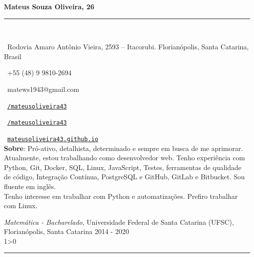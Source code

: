 \documentclass[a4paper,10pt]{article}
\makeatletter
\newcommand{\profissional}{Mateus Souza Oliveira}
\newcommand{\idade}{26}
\newcommand{\Endereco}{Rodovia Amaro Antônio Vieira, 2593 -- Itacorubi. Florianópolis, Santa Catarina, Brasil}
\newcommand{\telefone}{+55 (48) 9 9810-2694}
\newcommand{\email}{matews1943@gmail.com}
\newcommand{\sobre}{
    Pró-ativo, detalhista, determinado e sempre em busca de me aprimorar. Atualmente, estou trabalhando como desenvolvedor web. Tenho experiência com Python, Git, Docker, SQL, Linux, JavaScript, Testes, ferramentas de qualidade de código, Integração Contínua, PostgreSQL e GitHub, GitLab e Bitbucket. Sou fluente em inglês.\\

    Tenho interesse em trabalhar com Python e automatizações. Prefiro trabalhar com Linux.
}
\newcommand{\criaSecao}[4][0]{
	\begin{tcolorbox}[
        blanker,
        breakable,
        title=\begin{minipage}{0.16\linewidth}\large{\textbf{#2}}\vspace{-#3\baselineskip}\end{minipage},
        coltitle=black,
        leftupper=0.21\linewidth,
    ]
        #4
		\ifnum0#1>0 { \hrule {\ } } \fi
    \end{tcolorbox}
}
\makeatother
\begin{document}
	\begin{minipage}{0.65\linewidth}
		\Huge{\bf \profissional, \idade}\\\vspace{-1.75\baselineskip}

		\noindent\rule{\textwidth}{1.5pt} {\ }\\\vspace{-1.8\baselineskip}

		\large{
		\faMapMarker \ \Endereco \\
		\begin{minipage}{0.5\linewidth}
			\faWhatsapp \ \telefone
		\end{minipage}
		\begin{minipage}{0.5\linewidth}
			\faEnvelope \ \email
		\end{minipage}
		\begin{minipage}{0.5\linewidth}
			\faLinkedinSquare \ \href{https://www.linkedin.com/in/mateusoliveira43/}{\texttt{/mateusoliveira43}}
		\end{minipage}
		\begin{minipage}{0.5\linewidth}
			\faGithub \ \href{https://github.com/mateusoliveira43}{\texttt{/mateusoliveira43}}
		\end{minipage}
		\faLink \ \href{https://mateusoliveira43.github.io/}{\texttt{mateusoliveira43.github.io}}\\
		\vfill
		\textbf{Sobre}:\sobre
		}
	\end{minipage}
	\vspace{\baselineskip}

    \criaSecao[1]{Educação}{2}{
		\textit{Matemática - Bacharelado}, Universidade Federal de Santa Catarina (UFSC), Florianópolis, Santa Catarina \hfill 2014 - 2020 \\
    }
\end{document}
